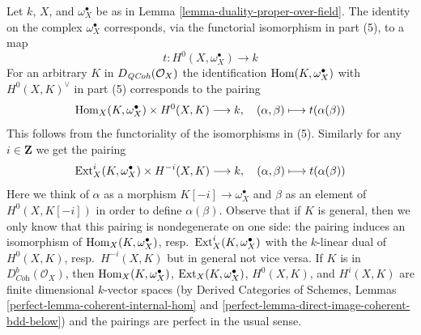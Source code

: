 \begin{remark}
\label{remark-duality-proper-over-field}
Let $k$, $X$, and $\omega_X^\bullet$
be as in Lemma \ref{lemma-duality-proper-over-field}.
The identity on the complex $\omega_X^\bullet$ corresponds, via
the functorial isomorphism in part (5), to a map
$$
t : H^0(X, \omega_X^\bullet) \longrightarrow k
$$
For an arbitrary $K$ in $D_{\mathit{QCoh}}(\mathcal{O}_X)$ the identification
$\mathop{\mathrm{Hom}}\nolimits(K, \omega_X^\bullet)$ with $H^0(X, K)^\vee$ in part (5)
corresponds to the pairing
$$
\mathop{\mathrm{Hom}}\nolimits_X(K, \omega_X^\bullet) \times H^0(X, K) \longrightarrow k,\quad
(\alpha, \beta) \longmapsto t(\alpha(\beta))
$$
This follows from the functoriality of the isomorphisms in (5). Similarly
for any $i \in \mathbf{Z}$ we get the pairing
$$
\mathop{\mathrm{Ext}}\nolimits^i_X(K, \omega_X^\bullet) \times H^{-i}(X, K) \longrightarrow k,\quad
(\alpha, \beta) \longmapsto t(\alpha(\beta))
$$
Here we think of $\alpha$ as a morphism $K[-i] \to \omega_X^\bullet$
and $\beta$ as an element of $H^0(X, K[-i])$ in order to define
$\alpha(\beta)$. Observe that if $K$ is general, then we only know
that this pairing is nondegenerate on one side: the pairing induces an
isomorphism of $\mathop{\mathrm{Hom}}\nolimits_X(K, \omega_X^\bullet)$,
resp.\ $\mathop{\mathrm{Ext}}\nolimits^i_X(K, \omega_X^\bullet)$ with the $k$-linear dual of $H^0(X, K)$,
resp.\ $H^{-i}(X, K)$ but in general not vice versa. If $K$
is in $D^b_{\textit{Coh}}(\mathcal{O}_X)$, then
$\mathop{\mathrm{Hom}}\nolimits_X(K, \omega_X^\bullet)$, $\mathop{\mathrm{Ext}}\nolimits_X(K, \omega_X^\bullet)$,
$H^0(X, K)$, and $H^i(X, K)$ are finite dimensional $k$-vector spaces (by
Derived Categories of Schemes, Lemmas
\ref{perfect-lemma-coherent-internal-hom} and
\ref{perfect-lemma-direct-image-coherent-bdd-below})
and the pairings are perfect in the usual sense.
\end{remark}

